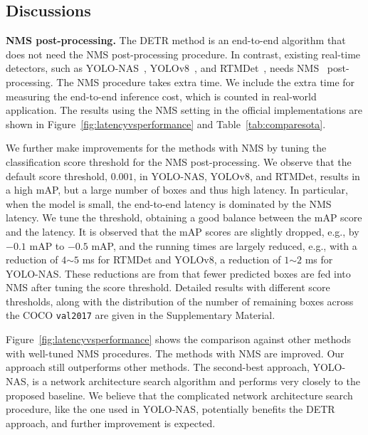 \documentclass[runningheads]{llncs}
\begin{document}
\subsection{Discussions}
\noindent\textbf{NMS post-processing.} 
The DETR method is an end-to-end algorithm that does not need the NMS post-processing procedure. 
In contrast, existing real-time detectors, such as YOLO-NAS~\cite{supergradients}, YOLOv8~\cite{yolov8_ultralytics}, and RTMDet~\cite{lyu2022rtmdet}, needs NMS~\cite{hosang2017learning} post-processing. 
The NMS procedure takes extra time.
We include the extra time
for measuring the end-to-end inference cost,
which is counted in real-world application.
The results using the NMS setting in
the official implementations are shown in
Figure~\ref{fig:latencyvsperformance} and Table~\ref{tab:comparesota}.

We further make improvements for the methods with NMS 
by tuning the classification score threshold 
for the NMS post-processing. 
We observe that the default score threshold, 
$0.001$, in YOLO-NAS, YOLOv8, and RTMDet, 
results in a high mAP, but a large number of boxes and thus high latency. 
In particular, when the model is small, 
the end-to-end latency is dominated by the NMS latency. We tune the threshold, 
obtaining a good balance between the mAP score and the latency. 
It is observed that the mAP scores are slightly dropped, e.g., by $-0.1$ mAP to $-0.5$ mAP, and the running times are largely reduced, e.g., 
with a reduction of $4$$\sim$$5$ ms for RTMDet and YOLOv8, a reduction of $1$$\sim$$2$ ms for YOLO-NAS. These reductions are from that fewer predicted boxes are fed into NMS after tuning the score threshold. Detailed results with different score thresholds, along with the distribution of the number of remaining boxes across the COCO \texttt{val2017} are given in the Supplementary Material.

Figure~\ref{fig:latencyvsperformance} shows the comparison against other methods with well-tuned NMS procedures.
The methods with NMS are improved. 
Our approach still outperforms other methods. 
The second-best approach, YOLO-NAS, is a network architecture search algorithm and performs very closely to the proposed baseline. We believe that the complicated network architecture search procedure, like the one used in YOLO-NAS, potentially benefits the DETR approach, and further improvement is expected.
\end{document}
